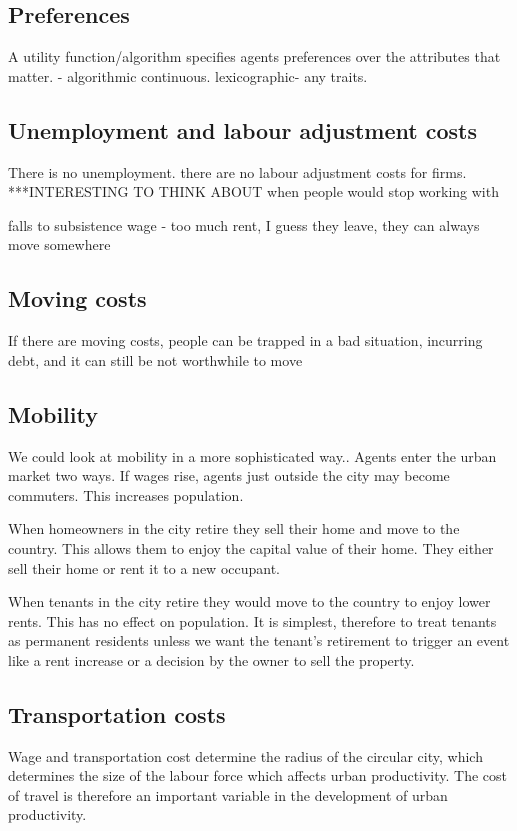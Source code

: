 \subsection{Preferences}
A utility function/algorithm specifies agents preferences over the attributes that matter. - algorithmic continuous. lexicographic- any traits. 

\subsection{Unemployment and labour adjustment costs}
There is no unemployment. there are no labour adjustment costs for firms. ***INTERESTING TO THINK ABOUT  
when people would stop working with

 falls to subsistence wage -
 too much rent, I guess they leave, they can always move somewhere

\subsection{Moving costs}
     If there are moving costs, people can be trapped in a bad situation, incurring debt, and it can still be not worthwhile to move

\subsection{Mobility}
We could look at mobility in a more sophisticated way..
Agents enter the urban market two ways. If wages rise, agents just outside the city may become commuters. This increases population. 

When homeowners in the city retire they sell their home and move to the country. This allows them  to enjoy the capital value of their home.  They either sell their home or rent it to a new occupant. 

When  tenants in the city retire they would move to the country to enjoy lower rents. This has no effect on population. It is simplest, therefore to treat tenants as permanent residents unless we want the tenant's retirement to trigger an event like a rent increase or a decision by the owner to sell the property.

\subsection{Transportation costs}
Wage and transportation cost determine the radius of the circular city, which determines the size of the labour force which affects urban productivity. The cost of travel is therefore an important variable in the development of urban productivity. 

